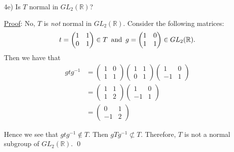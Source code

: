 \documentclass{article}
\begin{document}
\pagebreak 4e) Is $T$ normal in $GL_{2}(\mathbb{R})$?

\underline{Proof}: No, $T$ is \textit{not} normal in $GL_{2}(\mathbb{R})$. Consider the following matrices:
$$t =
\begin{pmatrix}
	1 & 1 \\
	0 & 1
\end{pmatrix} \in T \text{\, and \,} g = 
\begin{pmatrix}
	1 & 0 \\
	1 & 1
\end{pmatrix} \in GL_{2}(\mathbb{R}).$$ Then we have that
\begin{align*}
	gtg^{-1} &=
	\begin{pmatrix}
		1 & 0 \\
		1 & 1
	\end{pmatrix}
	\begin{pmatrix}
		1 & 1 \\
		0 & 1
	\end{pmatrix}
	\begin{pmatrix}
		1 & 0 \\
		-1 & 1
	\end{pmatrix} \\
	&=
	\begin{pmatrix}
		1 & 1 \\
		1 & 2
	\end{pmatrix}
	\begin{pmatrix}
		1 & 0 \\
		-1 & 1
	\end{pmatrix} \\
	&=
	\begin{pmatrix}
		0 & 1 \\
		-1 & 2
	\end{pmatrix}
\end{align*}

Hence we see that $gtg^{-1} \not \in T.$ Then $gTg^{-1} \not \subset T.$ Therefore, $T$ is not a normal subgroup of $GL_2(\mathbb{R})$. \qed \\
\end{document}
